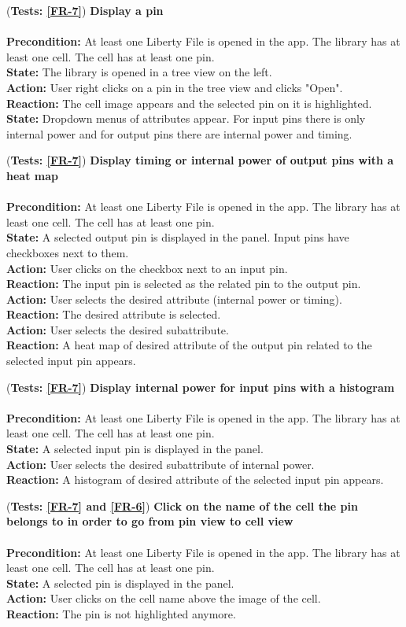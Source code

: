 \documentclass[10pt,a4paper]{report}
\newcommand{\precondition}[1]{
    \textbf{Precondition: } #1 \leavevmode \\
}
\newcommand{\action}[1]{
    \textbf{Action: } #1 \leavevmode \\
}
\newcommand{\state}[1]{
    \textbf{State: } #1 \leavevmode \\
}
\newcommand{\reaction}[1]{
    \textbf{Reaction: } #1 \leavevmode \\
}
\newcommand{\GTCDescription}[2]{
    (\textbf{Tests: #1}) \textbf{#2} \leavevmode \\
}
\begin{document}
\begin{GTC}
    \item \GTCDescription{\ref{FR-7}}
    {Display a pin} \leavevmode \\ 
        \precondition{At least one Liberty File is opened in the app. The library has at least one cell. The cell has at least one pin.}
        \state{The library is opened in a tree view on the left.}
        \action{User right clicks on a pin in the tree view and clicks "Open".}
        \reaction{The cell image appears and the selected pin on it is highlighted.}
        \state{Dropdown menus of attributes appear. For input pins there is only internal power and for output pins there are internal power and timing.}\label{GTC-19}
    
    \item \GTCDescription{\ref{FR-7}}
    {Display timing or internal power of output pins with a heat map} \leavevmode \\ 
        \precondition{At least one Liberty File is opened in the app. The library has at least one cell. The cell has at least one pin.}
        \state{A selected output pin is displayed in the panel. Input pins have checkboxes next to them.}
        \action{User clicks on the checkbox next to an input pin.}
        \reaction{The input pin is selected as the related pin to the output pin.}
        \action{User selects the desired attribute (internal power or timing).}
        \reaction{The desired attribute is selected.}
        \action{User selects the desired subattribute.}
        \reaction{A heat map of desired attribute of the output pin related to the selected input pin appears.}\label{GTC-20}
    
    \item \GTCDescription{\ref{FR-7}}
    {Display internal power for input pins with a histogram} \leavevmode \\ 
        \precondition{At least one Liberty File is opened in the app. The library has at least one cell. The cell has at least one pin.}
        \state{A selected input pin is displayed in the panel.}
        \action{User selects the desired subattribute of internal power.}
        \reaction{A histogram of desired attribute of the selected input pin appears.}\label{GTC-21}
    
    \item \GTCDescription{\ref{FR-7} and \ref{FR-6}}
    {Click on the name of the cell the pin belongs to in order to go from pin view to cell view} \leavevmode \\ 
        \precondition{At least one Liberty File is opened in the app. The library has at least one cell. The cell has at least one pin.}
        \state{A selected pin is displayed in the panel.}
        \action{User clicks on the cell name above the image of the cell.}
        \reaction{The pin is not highlighted anymore.}\label{GTC-22}
    

\end{GTC}
\end{document}
